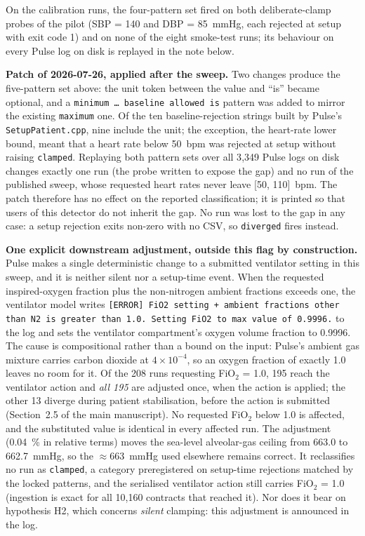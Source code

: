 \documentclass[pdflatex,sn-nature]{sn-jnl}%
\newcommand{\mainref}[2]{#2}
\begin{document}
\noindent On the calibration runs, the four-pattern set fired on both deliberate-clamp probes of the pilot (SBP = 140 and DBP = 85~mmHg, each rejected at setup with exit code 1) and on none of the eight smoke-test runs; its behaviour on every Pulse log on disk is replayed in the note below.

\noindent \textbf{Patch of 2026-07-26, applied after the sweep.} Two changes produce the five-pattern set above: the unit token between the value and ``is'' became optional, and a \texttt{minimum \ldots\ baseline allowed is} pattern was added to mirror the existing \texttt{maximum} one. Of the ten baseline-rejection strings built by Pulse's \texttt{SetupPatient.cpp}, nine include the unit; the exception, the heart-rate lower bound, meant that a heart rate below 50~bpm was rejected at setup without raising \texttt{clamped}. Replaying both pattern sets over all 3{,}349 Pulse logs on disk changes exactly one run (the probe written to expose the gap) and no run of the published sweep, whose requested heart rates never leave [50, 110]~bpm. The patch therefore has no effect on the reported classification; it is printed so that users of this detector do not inherit the gap. No run was lost to the gap in any case: a setup rejection exits non-zero with no CSV, so \texttt{diverged} fires instead.

\noindent \textbf{One explicit downstream adjustment, outside this flag by construction.} Pulse makes a single deterministic change to a submitted ventilator setting in this sweep, and it is neither silent nor a setup-time event. When the requested inspired-oxygen fraction plus the non-nitrogen ambient fractions exceeds one, the ventilator model writes \texttt{[ERROR] FiO2 setting + ambient fractions other than N2 is greater than 1.0. Setting FiO2 to max value of 0.9996.} to the log and sets the ventilator compartment's oxygen volume fraction to 0.9996. The cause is compositional rather than a bound on the input: Pulse's ambient gas mixture carries carbon dioxide at $4 \times 10^{-4}$, so an oxygen fraction of exactly 1.0 leaves no room for it. Of the 208 runs requesting FiO$_2$ = 1.0, 195 reach the ventilator action and \emph{all 195} are adjusted once, when the action is applied; the other 13 diverge during patient stabilisation, before the action is submitted (Section~\mainref{sec:results-sex}{2.5} of the main manuscript). No requested FiO$_2$ below 1.0 is affected, and the substituted value is identical in every affected run. The adjustment (0.04~\% in relative terms) moves the sea-level alveolar-gas ceiling from 663.0 to 662.7~mmHg, so the $\approx$663~mmHg used elsewhere remains correct. It reclassifies no run as \texttt{clamped}, a category preregistered on setup-time rejections matched by the locked patterns, and the serialised ventilator action still carries FiO$_2$ = 1.0 (ingestion is exact for all 10{,}160 contracts that reached it). Nor does it bear on hypothesis H2, which concerns \emph{silent} clamping: this adjustment is announced in the log.
\end{document}
